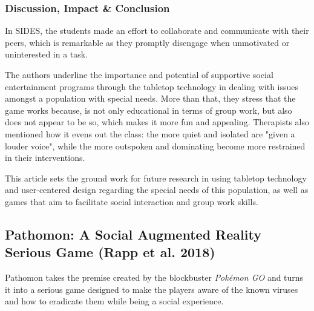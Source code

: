 \documentclass[runningheads]{llncs}
\begin{document}
\subsubsection{Discussion, Impact \& Conclusion}
\par In SIDES, the students made an effort to collaborate and communicate with their peers, which is remarkable as they promptly disengage when unmotivated or uninterested in a task.
\par The authors underline the importance and potential of supportive social entertainment programs through the tabletop technology in dealing with issues amongst a population with special needs. More than that, they stress that the game works because, is not only educational in terms of group work, but also does not appear to be so, which makes it more fun and appealing. Therapists also mentioned how it evens out the class: the more quiet and isolated are "given a louder voice", while the more outspoken and dominating become more restrained in their interventions.
\par This article sets the ground work for future research in using tabletop technology and user-centered design regarding the special needs of this population, as well as games that aim to facilitate social interaction and group work skills. 

\subsection{Pathomon: A Social Augmented Reality Serious Game (Rapp et al. 2018)}
\par Pathomon takes the premise created by the blockbuster \textit{Pokémon GO} and turns it into a serious game designed to make the players aware of the known viruses and how to eradicate them while being a social experience.
\end{document}
